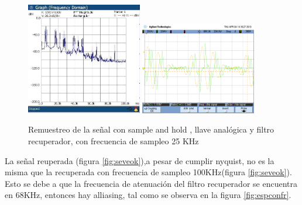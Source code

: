 \documentclass[../../ASSD_TP1_G7.tex]{subfiles}
\begin{document}
\begin{figure}[H]
\centering
{}

{\includegraphics[width=0.45\textwidth]{figures/confr.jpeg}} 
{\includegraphics[width=0.45\textwidth]{figures/scope1.png}}
\caption{Remuestreo de la se\~nal con sample and hold , llave analógica y filtro recuperador, con frecuencia de sampleo 25 KHz}
\end{figure}

La se\~nal reuperada (figura \ref{fig:seveok}),a pesar de cumplir nyquist, no es la misma que la recuperada con frecuencia de sampleo 100KHz(figura \ref{fig:seveok}). Esto se debe a que la frecuencia de atenuación del filtro recuperador se encuentra en 68KHz, entonces hay alliasing, tal como se observa en la figura \ref{fig:espconfr}.
\end{document}
